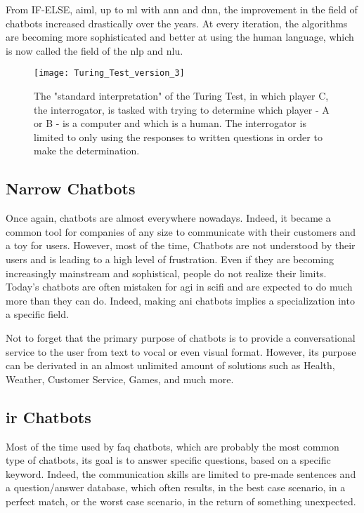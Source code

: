 From IF-ELSE, \gls{aiml}, up to \gls{ml} with \gls{ann} and \gls{dnn}, the improvement in the field of chatbots increased drastically over the years. At every iteration, the algorithms are becoming more sophisticated and better at using the human language, which is now called the field of the \gls{nlp} and \gls{nlu}.

\begin{figure}[ht!]
    \centering
    \texttt{[image: Turing\_Test\_version\_3]}
    \caption{
       The "standard interpretation" of the Turing Test, in which player C, the interrogator, is tasked with trying to determine which player - A or B - is a computer and which is a human. The interrogator is limited to only using the responses to written questions in order to make the determination. \cite{wikipedia:turing_test_img}
    }
    \label{fig:wikipedia_turing_test_img}
\end{figure}

\subsection{Narrow Chatbots}
Once again, chatbots are almost everywhere nowadays. Indeed, it became a common tool for companies of any size to communicate with their customers and a toy for users. However, most of the time, Chatbots are not understood by their users and is leading to a high level of frustration. Even if they are becoming increasingly mainstream and sophistical, people do not realize their limits. Today's chatbots are often mistaken for \gls{agi} in \gls{scifi} and are expected to do much more than they can do. Indeed, making \gls{ani} chatbots implies a specialization into a specific field.

Not to forget that the primary purpose of chatbots is to provide a conversational service to the user from text to vocal or even visual format. However, its purpose can be derivated in an almost unlimited amount of solutions such as Health, Weather, Customer Service, Games, and much more.

\subsection{\gls{ir} Chatbots}
Most of the time used by \gls{faq} chatbots, which are probably the most common type of chatbots, its goal is to answer specific questions, based on a specific keyword. Indeed, the communication skills are limited to pre-made sentences and a question/answer database, which often results, in the best case scenario, in a perfect match, or the worst case scenario, in the return of something unexpected.

